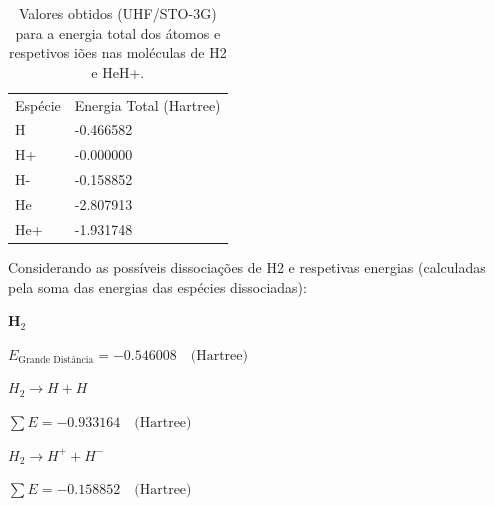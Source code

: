 \documentclass[portuguese,]{article}
\begin{document}
\begin{longtable}[]{@{}ll@{}}
\caption{Valores obtidos (UHF/STO-3G) para a energia total dos átomos e
respetivos iões nas moléculas de H2 e HeH+.
\label{tab:atoms}}\tabularnewline
\toprule
\endhead
\begin{minipage}[t]{0.13\columnwidth}\raggedright
Espécie\strut
\end{minipage} & \begin{minipage}[t]{0.35\columnwidth}\raggedright
Energia Total (Hartree)\strut
\end{minipage}\tabularnewline
\begin{minipage}[t]{0.13\columnwidth}\raggedright
H\strut
\end{minipage} & \begin{minipage}[t]{0.35\columnwidth}\raggedright
-0.466582\strut
\end{minipage}\tabularnewline
\begin{minipage}[t]{0.13\columnwidth}\raggedright
H+\strut
\end{minipage} & \begin{minipage}[t]{0.35\columnwidth}\raggedright
-0.000000\strut
\end{minipage}\tabularnewline
\begin{minipage}[t]{0.13\columnwidth}\raggedright
H-\strut
\end{minipage} & \begin{minipage}[t]{0.35\columnwidth}\raggedright
-0.158852\strut
\end{minipage}\tabularnewline
\begin{minipage}[t]{0.13\columnwidth}\raggedright
He\strut
\end{minipage} & \begin{minipage}[t]{0.35\columnwidth}\raggedright
-2.807913\strut
\end{minipage}\tabularnewline
\begin{minipage}[t]{0.13\columnwidth}\raggedright
He+\strut
\end{minipage} & \begin{minipage}[t]{0.35\columnwidth}\raggedright
-1.931748\strut
\end{minipage}\tabularnewline
\bottomrule
\end{longtable}

Considerando as possíveis dissociações de H2 e respetivas energias
(calculadas pela soma das energias das espécies dissociadas):

\begin{minipage}{\textwidth}

$\textbf{H}_2$

\quad $E_\text{Grande Distância} = -0.546008 \quad \text{(Hartree)}$

\qquad $H_2 \longrightarrow H + H$

\qquad \quad $\sum E = -0.933164 \quad \text{(Hartree)}$

\qquad $H_2 \longrightarrow H^+ + H^-$

\qquad \quad $\sum E = -0.158852 \quad \text{(Hartree)}$

\end{minipage}
\end{document}
